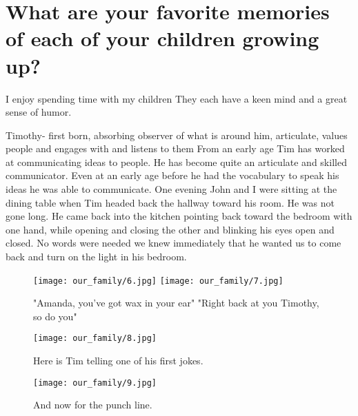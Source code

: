 \section{What are your favorite memories of each of your children growing up?}
I enjoy spending time with my children They each have a keen mind and a great sense of humor.

Timothy- first born, absorbing observer of what is around him, articulate, values people and engages with and listens to them
From an early age Tim has worked at communicating ideas to people.
He has become quite an articulate and skilled communicator.
Even at an early age before he had the vocabulary to speak his ideas he was able to communicate.
One evening John and I were sitting at the dining table when Tim headed back the hallway toward his room.
He was not gone long.
He came back into the kitchen pointing back toward the bedroom with one hand, while opening and closing the other and blinking his eyes open and closed.
No words were needed we knew immediately that he wanted us to come back and turn on the light in his bedroom.
\begin{figure}
\centering
\texttt{[image: our\_family/6.jpg]}
\texttt{[image: our\_family/7.jpg]}
\caption{
"Amanda, you've got wax in your ear"
"Right back at you Timothy, so do you"
}
\end{figure}

\begin{figure}
\centering
\texttt{[image: our\_family/8.jpg]}
\caption{
Here is Tim telling one of his first jokes.
}
\end{figure}

\begin{figure}
\centering
\texttt{[image: our\_family/9.jpg]}
\caption{
And now for the punch line.
}
\end{figure}


